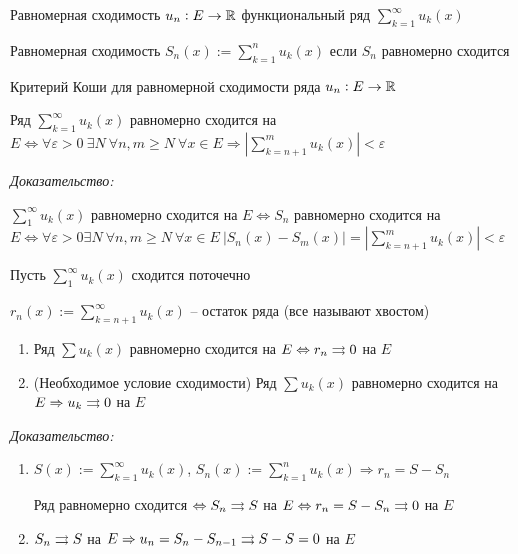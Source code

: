 \documentclass[12pt]{article}
\begin{document}
\begin{defin}{Равномерная сходимость}
    $u_n : E \to \mathbb R$ функциональный ряд $\sum\limits_{k = 1}^\infty u_k(x)$

    Равномерная сходимость $S_n(x) := \sum\limits_{k = 1}^n u_k(x)$ если $S_n$ равномерно сходится
\end{defin}

\begin{theo}{Критерий Коши для равномерной сходимости ряда}
    $u_n : E \to \mathbb R$ 
    
    Ряд $\sum\limits_{k = 1}^\infty u_k(x)$ равномерно сходится на $E \Leftrightarrow \forall \varepsilon > 0\ \exists N\ \forall n, m \geq N\ \forall x \in E \Rightarrow |\sum\limits_{k = n + 1}^m u_k(x)| < \varepsilon$
\end{theo}

\textit{Доказательство:}

$\sum\limits_1^\infty u_k(x)$ равномерно сходится на $E \Leftrightarrow S_n$ равномерно сходится на $E \Leftrightarrow \forall \varepsilon > 0 \exists N\ \forall n, m \geq N\ \forall x \in E\ |S_n(x) - S_m(x)| = |\sum\limits_{k = n + 1}^m u_k(x)| < \varepsilon$

\begin{defin}{}
    Пусть $\sum\limits_1^\infty u_k(x)$ сходится поточечно

    $r_n(x) := \sum\limits_{k = n + 1}^\infty u_k(x)$ -- остаток ряда (все называют хвостом)
\end{defin}

\begin{theo}{}
    \begin{enumerate}
        \item Ряд $\sum u_k(x)$ равномерно сходится на $E \Leftrightarrow r_n \rightrightarrows 0$ на $E$
        \item (Необходимое условие сходимости) Ряд $\sum u_k(x)$ равномерно сходится на $E \Rightarrow u_k \rightrightarrows 0$ на $E$
    \end{enumerate}
\end{theo}

\textit{Доказательство:}

\begin{enumerate}
    \item $S(x) := \sum\limits_{k = 1}^\infty u_k(x)$, $S_n(x) := \sum\limits_{k = 1}^n u_k(x) \Rightarrow r_n = S - S_n$

    Ряд равномерно сходится $\Leftrightarrow S_n \rightrightarrows S$ на $E \Leftrightarrow r_n = S - S_n \rightrightarrows 0$ на $E$

    \item $S_n \rightrightarrows S$ на $E \Rightarrow u_n = S_n - S_{n - 1} \rightrightarrows S - S = 0$ на $E$
\end{enumerate}
\end{document}
